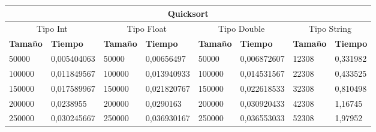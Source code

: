 \documentclass[11pt,openany]{book}
\begin{document}
\begin{table}[!ht]
    \centering
    \small
    \begin{tabular}{|l|l|l|l|l|l|l|l|}
        \hline
        \multicolumn{8}{|c|}{\cellcolor{blue!20}\textbf{Quicksort}}                                                                                                                                                                                                                                \\ \hline
        \multicolumn{2}{|c|}{\cellcolor{gray!20}Tipo Int} & \multicolumn{2}{c|}{\cellcolor{gray!20}Tipo Float} & \multicolumn{2}{c|}{\cellcolor{gray!20}Tipo Double} & \multicolumn{2}{c|}{\cellcolor{gray!20}Tipo String}                                                                         \\ \hline
        \textbf{Tamaño}                                   & \textbf{Tiempo}                                    & \textbf{Tamaño}                                     & \textbf{Tiempo}                                     & \textbf{Tamaño} & \textbf{Tiempo} & \textbf{Tamaño} & \textbf{Tiempo} \\ \hline
        50000                                             & 0,005404063                                        & 50000                                               & 0,00656497                                          & 50000           & 0,006872607     & 12308           & 0,331982        \\ \hline
        100000                                            & 0,011849567                                        & 100000                                              & 0,013940933                                         & 100000          & 0,014531567     & 22308           & 0,433525        \\ \hline
        150000                                            & 0,017589967                                        & 150000                                              & 0,021820767                                         & 150000          & 0,022618533     & 32308           & 0,810498        \\ \hline
        200000                                            & 0,0238955                                          & 200000                                              & 0,0290163                                           & 200000          & 0,030920433     & 42308           & 1,16745         \\ \hline
        250000                                            & 0,030245667                                        & 250000                                              & 0,036930167                                         & 250000          & 0,036553033     & 52308           & 1,97952         \\ \hline

\end{tabular}
\end{table}
\end{document}
